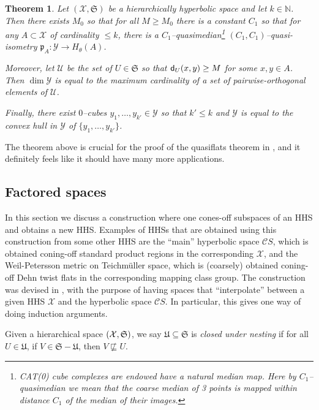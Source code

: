 \documentclass[11pt,oneside]{amsart}
\newcounter{ax}
\newtheorem{thm}{Theorem}[section]
\theoremstyle{definition}
\DeclareMathOperator{\dimension}{dim}
\newcommand{\field}[1]{\mathbb{#1}}
\newcommand{\naturals}{\ensuremath{\field{N}}}
\newcommand{\HHS}[2]{\ensuremath{(\cuco {#1},\frak {#2})}}
\newcommand{\co}{\colon}
\newcommand{\dist}{\textup{\textsf{d}}}
\newcommand{\cuco}[1]{{\mathcal #1}}
\newcommand{\fontact}{{\mathcal C}}
\newcommand{\nest}{\sqsubseteq}
\begin{document}
 \begin{thm}\label{thm:cubulated_hull}\cite[Theorem C]{HHS_quasiflats}
  Let $(\cuco X,\mathfrak S)$ be a hierarchically hyperbolic space and let $k\in\naturals$.  Then there exists $M_0$ so that for all $M\geq M_0$ there is a constant $C_1$ so that for any $A\subset\cuco X$ of cardinality $\leq k$, there is a $C_1$--quasimedian\footnote{CAT(0) cube complexes are endowed have a natural median map. Here by $C_1$--quasimedian we mean that the coarse median of 3 points is mapped within distance $C_1$ of the median of their images.}
  $(C_1,C_1)$--quasi-isometry $\mathfrak p_A\co\cuco Y\to H_\theta(A)$.
  
  Moreover, let $\mathcal U$ be the set of $U\in\mathfrak S$ so that $\dist_U(x,y)\geq M$ for some $x,y\in A$.  Then $\dimension\cuco Y$ is equal to the maximum cardinality of a set of pairwise-orthogonal elements of $\mathcal U$.
  
  Finally, there exist $0$--cubes $y_1,\ldots,y_{k'}\in\cuco Y$ so that $k'\leq k$ and $\cuco Y$ is equal to the convex hull in $\cuco Y$ of $\{y_1,\ldots,y_{k'}\}$.
 \end{thm}
 
 The theorem above is crucial for the proof of the quasiflats theorem in \cite{HHS_quasiflats}, and it definitely feels like it should have many more applications.


 \subsection{Factored spaces}
 
 In this section we discuss a construction where one cones-off subspaces of an HHS and obtains a new HHS. Examples of HHSs that are obtained using this construction from some other HHS are the ``main'' hyperbolic space $\fontact S$, which is obtained coning-off standard product regions in the corresponding $\cuco X$, and the Weil-Petersson metric on Teichm\"uller space, which is (coarsely) obtained coning-off Dehn twist flats in the corresponding mapping class group. The construction was devised in \cite{HHS_asdim}, with the purpose of having spaces that ``interpolate'' between a given HHS $\cuco X$ and the hyperbolic space $\fontact S$. In particular, this gives one way of doing induction arguments.
 
 Given a hierarchical space $\HHS X S$, we say $\mathfrak U\subseteq\mathfrak S$ is \emph{closed under nesting} if for all $U\in\mathfrak U$, if $V\in\mathfrak S-\mathfrak U$, then $V\not\nest U$.
\end{document}
